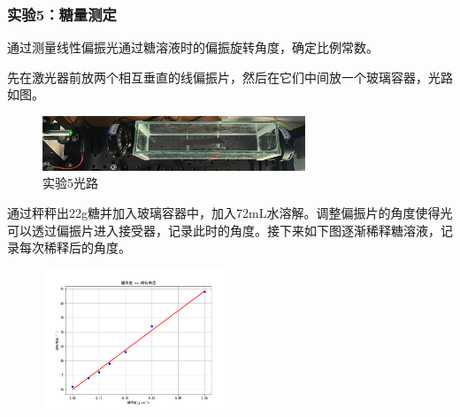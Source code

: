 \documentclass{ctexart}
\begin{document}
\subsubsection{实验5：糖量测定}
通过测量线性偏振光通过糖溶液时的偏振旋转角度，确定比例常数。

先在激光器前放两个相互垂直的线偏振片，然后在它们中间放一个玻璃容器，光路如图。
\begin{figure}[H]
    \centering
    \includegraphics[width=0.7\textwidth]{糖光路(1).jpg}
    \caption{实验5光路}
\end{figure}
通过秤秤出22g糖并加入玻璃容器中，加入72mL水溶解。调整偏振片的角度使得光可以透过偏振片进入接受器，记录此时的角度。接下来如下图逐渐稀释糖溶液，记录每次稀释后的角度。
\begin{figure}[H]
    \centering
    \includegraphics[width=0.5\textwidth]{糖浓度 vs 旋转角度.png}
\end{figure}
\end{document}
